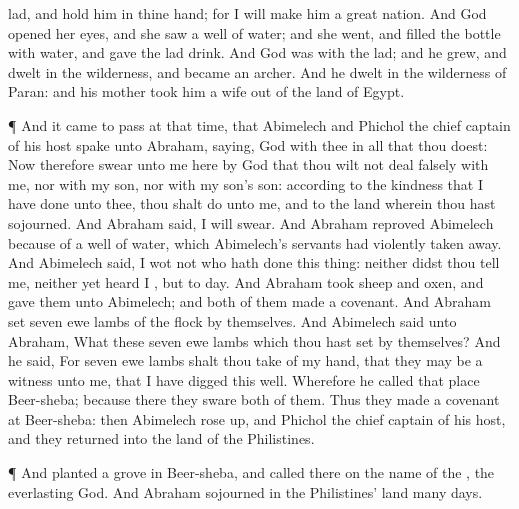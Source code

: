 {lad, and
hold him in thine
hand; for I will
make him a
great
nation.
And
God
opened her
eyes, and she
saw a
well of
water; and she
went, and
filled the
bottle with
water, and
gave the
lad
drink.
And
God was with the
lad; and he
grew, and
dwelt in the
wilderness, and became an
archer.
And he
dwelt in the
wilderness of
Paran: and his
mother
took him a
wife out of the
land of
Egypt.
\par }{\PP {}¶ And it came to pass at that
time, that
Abimelech and
Phichol the chief
captain of his
host
spake unto
Abraham,
saying,
God
{} with thee in all that thou
doest:
Now therefore
swear unto me
here by
God that thou wilt not deal
falsely with me, nor with my
son, nor with my
son’s son:
{} according to the
kindness that I have
done unto thee, thou shalt
do unto me, and to the
land wherein thou hast
sojourned.
And
Abraham
said, I will
swear.
And
Abraham
reproved
Abimelech
because of a
well of
water, which
Abimelech’s
servants had violently taken
away.
And
Abimelech
said, I
wot not who hath
done this
thing:
neither didst thou
tell me,
neither yet
heard I
{},
but to
day.
And
Abraham
took
sheep and
oxen, and
gave them unto
Abimelech; and both of
them
made a
covenant.
And
Abraham
set
seven ewe
lambs of the
flock by themselves.
And
Abimelech
said unto
Abraham,
What
{} these
seven ewe
lambs which thou hast
set by themselves?
And he
said, For
{}
seven ewe
lambs shalt thou
take of my
hand,
that they may be a
witness unto me, that I have
digged this
well.
Wherefore he
called that
place
Beer-sheba; because there they
sware both of
them.
Thus they
made a
covenant at
Beer-sheba: then
Abimelech rose
up, and
Phichol the chief
captain of his
host, and they
returned into the
land of the
Philistines.
\par }{\PP {}¶ And
{}
planted a
grove in
Beer-sheba, and
called there on the
name of the
{}, the
everlasting
God.
And
Abraham
sojourned in the
Philistines’
land
many
days.

}
